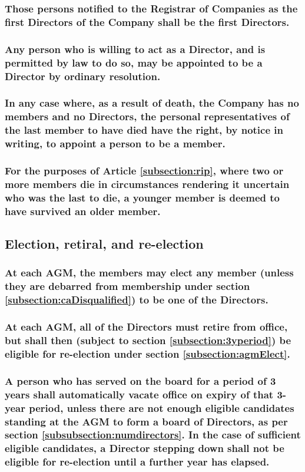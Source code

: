 \documentclass[12pt]{article}
\begin{document}
\subsubsection{Those persons notified to the Registrar of Companies as the first Directors of the Company shall be the first Directors.}
\subsubsection{Any person who is willing to act as a Director, and is permitted by law to do so, may be appointed to be a Director by ordinary resolution.}
\subsubsection{\label{subsection:rip}In any case where, as a result of death, the Company has no members and no Directors, the personal representatives of the last member to have died have the right, by notice in writing, to appoint a person to be a member.}
\subsubsection{For the purposes of Article \ref{subsection:rip}, where two or more members die in circumstances rendering it uncertain who was the last to die, a younger member is deemed to have survived an older member.}

\subsection{Election, retiral, and re-election}
\subsubsection{\label{subsection:agmElect}At each AGM, the members may elect any member (unless they are debarred from
membership under section \ref{subsection:caDisqualified}) to be one of the Directors.}
\subsubsection{At each AGM, all of the Directors must retire from office, but shall then (subject to section \ref{subsection:3yperiod}) be eligible for re-election under section \ref{subsection:agmElect}.}
\subsubsection{\label{subsection:3yperiod}A person who has served on the board for a period of 3 years shall automatically vacate office on expiry of that 3-year period, unless there are not enough eligible candidates standing at the AGM to form a board of Directors, as per section \ref{subsubsection:numdirectors}. In the case of sufficient eligible candidates, a Director stepping down shall not be eligible for re-election until a further year has elapsed.}
\end{document}
